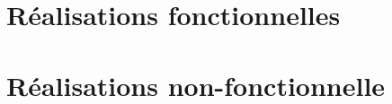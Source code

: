 \section{Réalisations fonctionnelles}

\subsection*{}

\subsection*{}

\subsection*{}



\section{Réalisations non-fonctionnelle}

\subsection*{}

\subsection*{}

\subsection*{}
